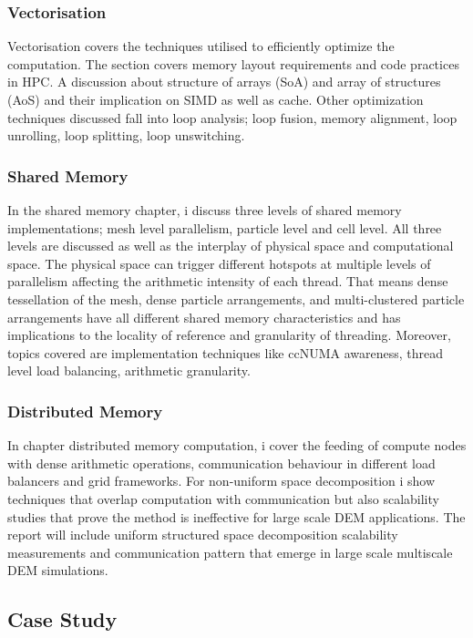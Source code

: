 \documentclass[times,12pt]{article}
\begin{document}
\subsubsection{Vectorisation}

Vectorisation covers the techniques utilised to efficiently optimize the computation. The section covers memory layout requirements and code practices in HPC. A discussion about structure of arrays (SoA) and array of structures (AoS) and their implication on SIMD as well as cache. Other optimization techniques discussed fall into loop analysis; loop fusion, memory alignment, loop unrolling, loop splitting, loop unswitching.

\subsubsection{Shared Memory}

In the shared memory chapter, i discuss three levels of shared memory implementations; mesh level parallelism, particle level and cell level. All three levels are discussed as well as the interplay of physical space and computational space. The physical space can trigger different hotspots at multiple levels of parallelism affecting the arithmetic intensity of each thread. That means dense tessellation of the mesh, dense particle arrangements, and multi-clustered particle arrangements have all different shared memory characteristics and has implications to the locality of reference and granularity of threading. Moreover, topics covered are implementation techniques like ccNUMA awareness, thread level load balancing, arithmetic granularity. 

\subsubsection{Distributed Memory}

In chapter distributed memory computation, i cover the feeding of compute nodes with dense arithmetic operations, communication behaviour in different load balancers and grid frameworks.
For non-uniform space decomposition i show techniques that overlap computation with communication but also scalability studies that prove the method is ineffective for large scale DEM applications. The report will include uniform structured space decomposition scalability measurements and communication pattern that emerge in large scale multiscale DEM simulations. 

\subsection{Case Study}
\end{document}
